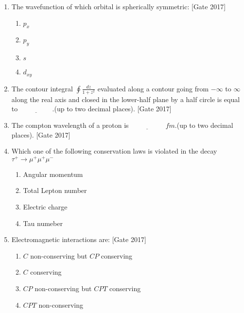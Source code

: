 \documentclass[journal]{IEEEtran}
\begin{document}
\begin{enumerate}
	\item The wavefunction of which orbital is spherically symmetric: \hfill{[Gate 2017]}
\begin{multicols}{4}
	\begin{enumerate}
		\item $p_x$
		\item $p_y$
		\item $s$
		\item $d_{xy}$
	\end{enumerate}
\end{multicols}
	\item The contour integral $\oint \frac{dz}{1+z^2}$ evaluated along a contour going from $- \infty$ to $\infty$ along the real axis and closed in the lower-half plane by a half circle is equal to $\underline{\hspace{2cm}}$.(up to two decimal places). \hfill{[Gate 2017]}
	\item The compton wavelength of a proton is $\underline{\hspace{2cm}}$ $fm$.(up to two decimal places).
	 \hfill{[Gate 2017]}
	\item Which one of the following conservation laws is violated in the decay $\tau^{+} \rightarrow \mu^+ \mu^+ \mu^-$
\begin{multicols}{2}
	\begin{enumerate}
		\item Angular momentum
		\item Total Lepton number
		\item Electric charge
		\item Tau numeber
	\end{enumerate}
\end{multicols}
	\item Electromagnetic interactions are: \hfill{[Gate 2017]}
	\begin{multicols}{2}
	\begin{enumerate}
		\item $C$ non-conserving but $CP$ conserving
		\item $C$ conserving 
		\item $CP$ non-conserving but $CPT$ conserving
		\item $CPT$ non-conserving
	\end{enumerate}
\end{multicols}

\end{enumerate}
\end{document}
